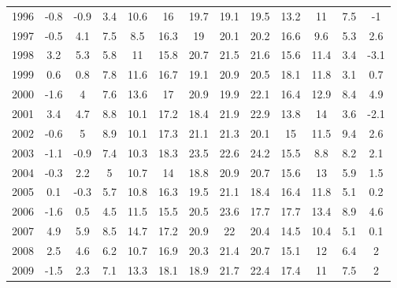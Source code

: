 \documentclass{article}
\begin{document}
\begin{table}[H]
\begin{tabular}{c c c c c c c c c c c c c}
        1996  &  -0.8   &  -0.9  &  3.4   &  10.6  &  16    &  19.7  &  19.1  &  19.5  &  13.2  &  11    &  7.5  &  -1     \\                       
        1997  &  -0.5   &  4.1   &  7.5   &  8.5   &  16.3  &  19    &  20.1  &  20.2  &  16.6  &  9.6   &  5.3  &  2.6    \\                       	
        1998  &  3.2    &  5.3   &  5.8   &  11    &  15.8  &  20.7  &  21.5  &  21.6  &  15.6  &  11.4  &  3.4  &  -3.1   \\                          	
        1999  &  0.6    &  0.8   &  7.8   &  11.6  &  16.7  &  19.1  &  20.9  &  20.5  &  18.1  &  11.8  &  3.1  &  0.7    \\                           	
        2000  &  -1.6   &  4     &  7.6   &  13.6  &  17    &  20.9  &  19.9  &  22.1  &  16.4  &  12.9  &  8.4  &  4.9    \\                       	
        2001  &  3.4    &  4.7   &  8.8   &  10.1  &  17.2  &  18.4  &  21.9  &  22.9  &  13.8  &  14    &  3.6  &  -2.1   \\                          	
        2002  &  -0.6   &  5     &  8.9   &  10.1  &  17.3  &  21.1  &  21.3  &  20.1  &  15    &  11.5  &  9.4  &  2.6    \\                       	
        2003  &  -1.1   &  -0.9  &  7.4   &  10.3  &  18.3  &  23.5  &  22.6  &  24.2  &  15.5  &  8.8   &  8.2  &  2.1    \\                           	
        2004  &  -0.3   &  2.2   &  5     &  10.7  &  14    &  18.8  &  20.9  &  20.7  &  15.6  &  13    &  5.9  &  1.5    \\                     	
        2005  &  0.1    &  -0.3  &  5.7   &  10.8  &  16.3  &  19.5  &  21.1  &  18.4  &  16.4  &  11.8  &  5.1  &  0.2    \\                            	
        2006  &  -1.6   &  0.5   &  4.5   &  11.5  &  15.5  &  20.5  &  23.6  &  17.7  &  17.7  &  13.4  &  8.9  &  4.6    \\                           	
        2007  &  4.9    &  5.9   &  8.5   &  14.7  &  17.2  &  20.9  &  22    &  20.4  &  14.5  &  10.4  &  5.1  &  0.1    \\                         	
        2008  &  2.5    &  4.6   &  6.2   &  10.7  &  16.9  &  20.3  &  21.4  &  20.7  &  15.1  &  12    &  6.4  &  2      \\                       	
        2009  &  -1.5   &  2.3   &  7.1   &  13.3  &  18.1  &  18.9  &  21.7  &  22.4  &  17.4  &  11    &  7.5  &  2      \\                       	

\end{tabular}
\end{table}
\end{document}
